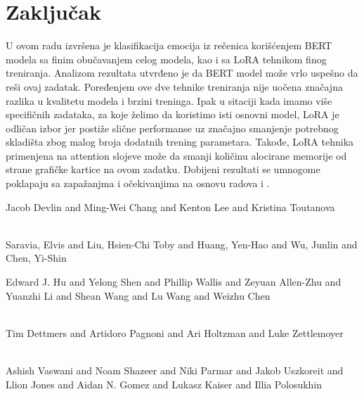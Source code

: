 \documentclass{article}
\theoremstyle{definition}
\begin{document}
	\section{Zaključak} \label{zakljucak} 
	U ovom radu izvršena je klasifikacija emocija iz rečenica korišćenjem BERT
	modela sa finim obučavanjem celog modela, kao i sa LoRA tehnikom finog 
	treniranja. Analizom rezultata utvrđeno je da BERT model može vrlo uspešno
	da reši ovaj zadatak. Poređenjem ove dve tehnike treniranja nije uočena
	značajna razlika u kvalitetu modela i brzini treninga. Ipak u sitaciji kada
	imamo više specifičnih zadataka, za koje želimo da koristimo isti osnovni 
	model, LoRA je odličan izbor jer postiže slične performanse uz značajno
	smanjenje potrebnog skladišta zbog malog broja dodatnih trening parametara.
	Takođe, LoRA tehnika primenjena na attention slojeve može da smanji količinu
	alocirane memorije od strane grafičke kartice na ovom zadatku. Dobijeni rezultati
	se umnogome poklapaju sa zapažanjma i očekivanjima na osnovu radova \cite{lora} i 
	\cite{qlora}.


	\newpage
	
	\begin{thebibliography}{99}
        Jacob Devlin and Ming-Wei Chang and Kenton Lee and Kristina Toutanova \\
         \\

        Saravia, Elvis  and
        Liu, Hsien-Chi Toby  and
        Huang, Yen-Hao  and
        Wu, Junlin  and
        Chen, Yi-Shin \\

        Edward J. Hu and Yelong Shen and Phillip Wallis and Zeyuan Allen-Zhu and Yuanzhi Li 
        and Shean Wang and Lu Wang and Weizhu Chen \\
         \\

		Tim Dettmers and Artidoro Pagnoni and Ari Holtzman and Luke Zettlemoyer \\
		 \\

		Ashish Vaswani and Noam Shazeer and Niki Parmar and Jakob Uszkoreit and 
		Llion Jones and Aidan N. Gomez and Lukasz Kaiser and Illia Polosukhin \\
		 \\
		
	\end{thebibliography}	
	
\end{document}

